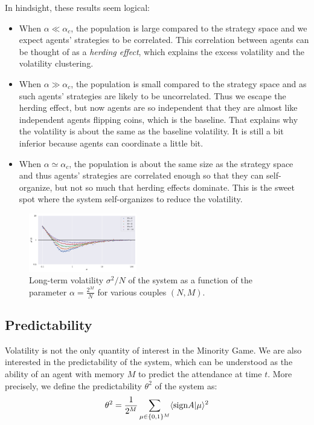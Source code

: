 \documentclass[a4paper, amsfonts, amssymb, amsmath, reprint, showkeys, nofootinbib, twoside]{revtex4-1}
\begin{document}
In hindsight, these results seem logical:
\begin{itemize}
    \item When $\alpha \ll \alpha_c$, the population is large compared to the strategy space and we expect agents' strategies to be correlated. This correlation between agents can be thought of as a \textit{herding effect}, which explains the excess volatility and the volatility clustering.
    \item When $\alpha \gg \alpha_c$, the population is small compared to the strategy space and as such agents' strategies are likely to be uncorrelated. Thus we escape the herding effect, but now agents are so independent that they are almost like independent agents flipping coins, which is the baseline. That explains why the volatility is about the same as the baseline volatility. It is still a bit inferior because agents can coordinate a little bit.
    \item When $\alpha \simeq \alpha_c$, the population is about the same size as the strategy space and thus agents' strategies are correlated enough so that they can self-organize, but not so much that herding effects dominate. This is the sweet spot where the system self-organizes to reduce the volatility.
\end{itemize}

\begin{figure}[H]
    \centering
    \includegraphics[width=0.42\textwidth]{figures/volatility.png}
    \caption{Long-term volatility $\sigma^2 / N$ of the system as a function of the parameter $\alpha = \frac{2^M}{N}$ for various couples $(N, M)$.}
    \label{fig:volatility}
\end{figure}

\subsection{Predictability}

Volatility is not the only quantity of interest in the Minority Game. We are also interested in the predictability of the system, which can be understood as the ability of an agent with memory $M$ to predict the attendance at time $t$. More precisely, we define the predictability $\theta^2$ of the system as:
\begin{equation}
    \theta^2 = \frac{1}{2^M} \sum_{\mu \in \{0, 1\}^M} \langle \textnormal{sign}A|\mu \rangle^2
\end{equation}
\end{document}
